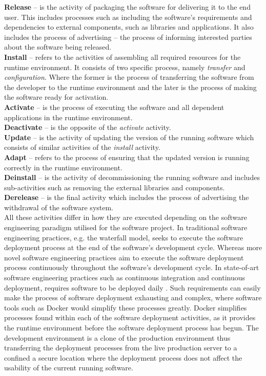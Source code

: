 \textbf{Release} – is the activity of packaging the software for delivering it to the end user. This includes processes such as including the software's requirements and dependencies to external components, such as libraries and applications. It also includes the process of advertising – the process of informing interested parties about the software being released.\\
\textbf{Install} – refers to the activities of assembling all required resources for the runtime environment. It consists of two specific process, namely \textit{transfer} and \textit{configuration}. Where the former is the process of transferring the software from the developer to the runtime environment and the later is the process of making the software ready for activation.\\
\textbf{Activate} – is the process of executing the software and all dependent applications in the runtime environment.\\
\textbf{Deactivate} – is the opposite of the \textit{activate} activity.\\
\textbf{Update} – is the activity of updating the version of the running software which consists of similar activities of the \textit{install} activity.\\
\textbf{Adapt} – refers to the process of ensuring that the updated version is running correctly in the runtime environment.\\
\textbf{Deinstall} – is the activity of decommissioning the running software and includes sub-activities such as removing the external libraries and components.\\
\textbf{Derelease} – is the final activity which includes the process of advertising the withdrawal of the software system.\\

All these activities differ in how they are executed depending on the software engineering paradigm utilised for the software project. In traditional software engineering practices, e.g. the waterfall model, seeks to execute the software deployment process at the end of the software's development cycle. Whereas more novel software engineering practices aim to execute the software deployment process continuously throughout the software's development cycle. In state-of-art software engineering practices such as continuous integration and continuous deployment, requires software to be deployed daily \cite{meyer2014continuous}. Such requirements can easily make the process of software deployment exhausting and complex, where software tools such as Docker would simplify these processes greatly. Docker simplifies processes found within each of the software deployment activities, as it provides the runtime environment before the software deployment process has begun. The development environment is a clone of the production environment thus transferring the deployment processes from the live production server to a confined a secure location where the deployment process does not affect the usability of the current running software.\\


